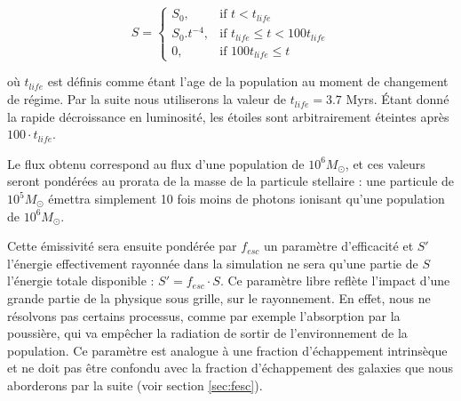 \begin{equation}
    S = 
\begin{cases}
    S_0 ,         & \text{if } t < t_{life}\\
    S_0.t^{-4},   & \text{if } t_{life} \leq t < 100t_{life} \\
    0,   & \text{if } 100t_{life} \leq t
\end{cases}
\end{equation}

où $t_{life}$ est définis comme étant l'age de la population au moment de changement de régime.
Par la suite nous utiliserons la valeur de $t_{life} = 3.7$ Myrs.
Étant donné la rapide décroissance en luminosité, les étoiles sont arbitrairement éteintes après $100 \cdot t_{life}$.

Le flux obtenu correspond au flux d'une population de $10^6M_\odot$, et ces valeurs seront pondérées au prorata de la masse de la particule stellaire : une particule de $10^5M_\odot$ émettra  simplement 10 fois moins de photons ionisant qu'une population de $10^6 M_\odot$.

Cette émissivité sera ensuite pondérée par $f_{esc}$ un paramètre d'efficacité  et $S'$ l'énergie effectivement rayonnée dans la simulation ne sera qu'une partie de $S$ l'énergie totale disponible : $S' = f_{esc} \cdot S$.
Ce paramètre libre reflète l'impact d'une grande partie de la physique sous grille, sur le rayonnement.
En effet, nous ne résolvons pas certains processus, comme par exemple l'absorption par la poussière, qui va empêcher la radiation de sortir de l’environnement de la population.
Ce paramètre est analogue à une fraction d'échappement intrinsèque et ne doit pas être confondu avec la fraction d'échappement des galaxies que nous aborderons par la suite (voir section \ref{sec:fesc}).



